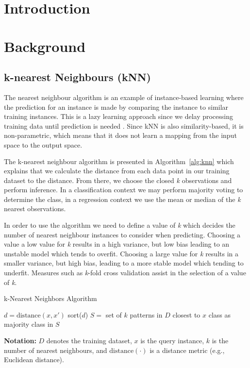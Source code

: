\documentclass[10pt, conference]{IEEEtran}
\begin{document}
\section{Introduction}
\section{Background}

\subsection{k-nearest Neighbours (kNN)}
The nearest neighbour algorithm is an example of instance-based learning where the prediction for an instance is made by comparing the instance to similar training instances. This is a lazy learning approach since we delay processing training data until prediction is needed \cite{kelleher2020fundamentals}. Since kNN is also similarity-based, it is non-parametric, which means that it does not learn a mapping from the input space to the output space.

The k-nearest neighbour algorithm is presented in Algorithm~\ref{alg:knn} which explains that we calculate the distance from each data point in our training dataset to the distance. From there, we choose the closed \textit{k} observations and perform inference. In a classification context we may perform majority voting to determine the class, in a regression context we use the mean or median of the \textit{k} nearest observations.

In order to use the algorithm we need to define a value of \textit{k} which decides the number of nearest neighbour instances to consider when predicting. Choosing a value a low value for \textit{k} results in a high variance, but low bias leading to an unstable model which tends to overfit. Choosing a large value for \textit{k} results in a smaller variance, but high bias, leading to a more stable model which tending to underfit. Measures such as \textit{k}-fold cross validation assist in the selection of a value of \textit{k}.

\begin{algorithm}[htbp]
\caption{k-Nearest Neighbors Algorithm}
\label{alg:knn}
\begin{algorithmic}
\State $d = \text{distance}(x, x')$
\EndFor
\State sort($d$)
\State $S = $ set of $k$ patterns in $D$ closest to $x$
\State \Return class as majority class in $S$
\EndFunction
\end{algorithmic}
\end{algorithm}
\noindent
\textbf{Notation:} $D$ denotes the training dataset, $x$ is the query instance, $k$ is the number of nearest neighbours, and $\text{distance}(\cdot)$ is a distance metric (e.g., Euclidean distance).
\end{document}

